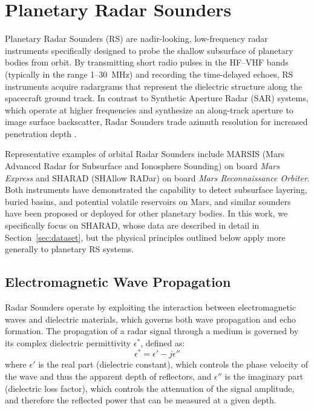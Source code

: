 \section{Planetary Radar Sounders}
\label{sec:planetary_radar_sounders}
Planetary Radar Sounders (RS) are nadir-looking, low-frequency radar instruments specifically designed to probe the shallow subsurface of planetary bodies from orbit.
By transmitting short radio pulses in the HF–VHF bands (typically in the range 1–30~MHz) and recording the time-delayed echoes, RS instruments acquire  radargrams that represent the dielectric structure along the spacecraft ground track.
In contrast to Synthetic Aperture Radar (SAR) systems, which operate at higher frequencies and synthesize an along-track aperture to image surface backscatter, Radar Sounders trade azimuth resolution for increased penetration depth .

Representative examples of orbital Radar Sounders include MARSIS\cite{Jordan_2009} (Mars Advanced Radar for Subsurface and Ionosphere Sounding) on board \emph{Mars Express}\cite{ESA_MarsExpress} and SHARAD (SHAllow RADar)\cite{Seu_2007} on board \emph{Mars Reconnaissance Orbiter}\cite{Zurek_2007}.
Both instruments have demonstrated the capability to detect subsurface layering, buried basins, and potential volatile reservoirs on Mars, and similar sounders have been proposed or deployed for other planetary bodies.
In this work, we specifically focus on SHARAD, whose data are described in detail in Section~\ref{sec:dataset}, but the physical principles outlined below apply more generally to planetary RS systems.

\subsection{Electromagnetic Wave Propagation}
\label{subsec:em_propagation}
Radar Sounders operate by exploiting the interaction between electromagnetic waves and dielectric materials, which governs both wave propagation and echo formation.
The propagation of a radar signal through a medium is governed by its complex dielectric permittivity $\epsilon^*$, defined as:
\begin{equation}
\epsilon^* = \epsilon' - j\epsilon''
\end{equation}
where $\epsilon'$ is the real part (dielectric constant), which controls the phase velocity of the wave and thus the apparent depth of reflectors, and $\epsilon''$ is the imaginary part (dielectric loss factor), which controls the attenuation of the signal amplitude, and therefore the reflected power that can be measured at a given depth.

